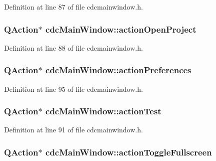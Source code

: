 Definition at line 87 of file cdcmainwindow.\+h.

\hypertarget{classcdc_main_window_a5b9b87879809858881d876d1108a7900}{
\subsubsection[{action\+Open\+Project}]{\setlength{\rightskip}{0pt plus 5cm}Q\+Action$\ast$ cdc\+Main\+Window\+::action\+Open\+Project\hspace{0.3cm}{\ttfamily [private]}}}\label{classcdc_main_window_a5b9b87879809858881d876d1108a7900}


Definition at line 88 of file cdcmainwindow.\+h.

\hypertarget{classcdc_main_window_a5a2cda69acc2d963b38593709d0b191e}{
\subsubsection[{action\+Preferences}]{\setlength{\rightskip}{0pt plus 5cm}Q\+Action$\ast$ cdc\+Main\+Window\+::action\+Preferences\hspace{0.3cm}{\ttfamily [private]}}}\label{classcdc_main_window_a5a2cda69acc2d963b38593709d0b191e}


Definition at line 95 of file cdcmainwindow.\+h.

\hypertarget{classcdc_main_window_abf4b137386bb0359be919260b3fa191e}{
\subsubsection[{action\+Test}]{\setlength{\rightskip}{0pt plus 5cm}Q\+Action$\ast$ cdc\+Main\+Window\+::action\+Test\hspace{0.3cm}{\ttfamily [private]}}}\label{classcdc_main_window_abf4b137386bb0359be919260b3fa191e}


Definition at line 91 of file cdcmainwindow.\+h.

\hypertarget{classcdc_main_window_a78e4d0015c1666c749ebb982d54f9ce4}{
\subsubsection[{action\+Toggle\+Fullscreen}]{\setlength{\rightskip}{0pt plus 5cm}Q\+Action$\ast$ cdc\+Main\+Window\+::action\+Toggle\+Fullscreen\hspace{0.3cm}{\ttfamily [private]}}}\label{classcdc_main_window_a78e4d0015c1666c749ebb982d54f9ce4}


